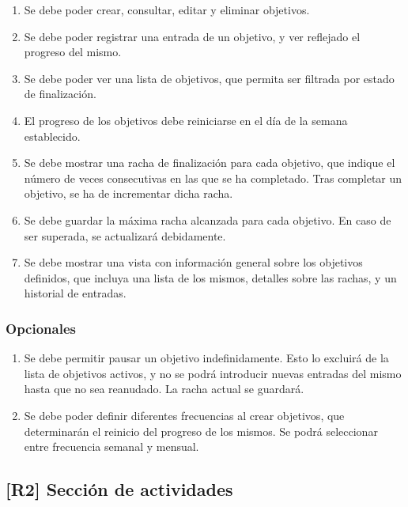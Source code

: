 \documentclass[10pt, a4paper]{aqademic}
\begin{document}
\begin{enumerate}[label=\textbf{R1.\arabic*f}, leftmargin=10mm]
	\item Se debe poder crear, consultar, editar y eliminar objetivos.
	
	\item Se debe poder registrar una entrada de un objetivo, y ver reflejado el progreso del mismo.
	
	\item Se debe poder ver una lista de objetivos, que permita ser filtrada por estado de finalización.
	
	\item El progreso de los objetivos debe reiniciarse en el día de la semana establecido.
	
	\item Se debe mostrar una racha de finalización para cada objetivo, que indique el número de veces consecutivas en las que se ha completado. Tras completar un objetivo, se ha de incrementar dicha racha.
	
	\item Se debe guardar la máxima racha alcanzada para cada objetivo. En caso de ser superada, se actualizará debidamente.
	
	\item Se debe mostrar una vista con información general sobre los objetivos definidos, que incluya una lista de los mismos, detalles sobre las rachas, y un historial de entradas.
\end{enumerate}


\subsubsection*{Opcionales}

\begin{enumerate}[label=\textbf{R1.\arabic*o}, leftmargin=10mm]
	\item Se debe permitir pausar un objetivo indefinidamente. Esto lo excluirá de la lista de objetivos activos, y no se podrá introducir nuevas entradas del mismo hasta que no sea reanudado. La racha actual se guardará.
	
	\item Se debe poder definir diferentes frecuencias al crear objetivos, que determinarán el reinicio del progreso de los mismos. Se podrá seleccionar entre frecuencia semanal y mensual.
\end{enumerate}


\subsection*{[R2] Sección de actividades}
\end{document}
